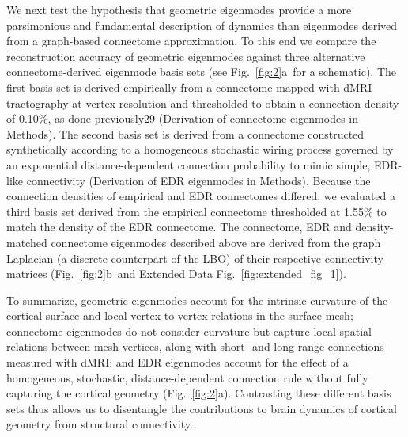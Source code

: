 \documentclass[sn-mathphys-num]{sn-jnl}%
\theoremstyle{thmstyleone}%
\theoremstyle{thmstyletwo}%
\theoremstyle{thmstylethree}%
\begin{document}
We next test the hypothesis that geometric eigenmodes provide a more parsimonious and fundamental description of dynamics than eigenmodes derived from a graph-based connectome approximation. 
To this end we compare the reconstruction accuracy of geometric eigenmodes against three alternative connectome-derived eigenmode basis sets (see Fig.~\ref{fig:2}a~for a schematic). 
The first basis set is derived empirically from a connectome mapped with dMRI tractography at vertex resolution and thresholded to obtain a connection density of  0.10\%, as done previously29 (Derivation of connectome eigenmodes in Methods). 
The second basis set is derived from a connectome constructed synthetically according to a homogeneous stochastic wiring process governed by an exponential distance-dependent connection probability to mimic simple, EDR-like connectivity (Derivation of EDR eigenmodes in Methods). 
Because the connection densities of empirical and EDR connectomes differed, we evaluated a third basis set derived from the empirical connectome thresholded at 1.55\% to match the density of the EDR connectome. 
The connectome, EDR and density-matched connectome eigenmodes described above are derived from the graph Laplacian (a discrete counterpart of the LBO) of their respective connectivity matrices (Fig.~\ref{fig:2}b~and Extended Data Fig.~\ref{fig:extended_fig_1}).


To summarize, geometric eigenmodes account for the intrinsic curvature of the cortical surface and local vertex-to-vertex relations in the surface mesh; 
connectome eigenmodes do not consider curvature but capture local spatial relations between mesh vertices, along with short- and long-range connections measured with dMRI; 
and EDR eigenmodes account for the effect of a homogeneous, stochastic, distance-dependent connection rule without fully capturing the cortical geometry (Fig.~\ref{fig:2}a). 
Contrasting these different basis sets thus allows us to disentangle the contributions to brain dynamics of cortical geometry from structural connectivity.
\end{document}
